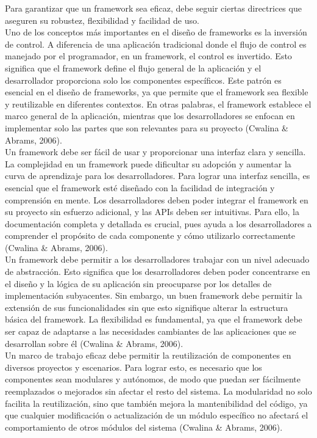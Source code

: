 \documentclass[12pt,letterpaper,spanish, xcolor=table]{report}
\numberwithin{figure}{subsection}
\begin{document}
Para garantizar que un framework sea eficaz, debe seguir ciertas directrices que aseguren su robustez, flexibilidad y facilidad de uso.\\

Uno de los conceptos más importantes en el diseño de frameworks es la inversión de control. A diferencia de una aplicación tradicional donde el flujo de control es manejado por el programador, en un framework, el control es invertido. Esto significa que el framework define el flujo general de la aplicación y el desarrollador proporciona solo los componentes específicos. Este patrón es esencial en el diseño de frameworks, ya que permite que el 
framework sea flexible y reutilizable en diferentes contextos. En otras palabras, el framework establece el marco general de la aplicación, mientras que los desarrolladores se enfocan en implementar solo las partes que son relevantes para su proyecto (Cwalina \& Abrams, 2006).\\

Un framework debe ser fácil de usar y proporcionar una interfaz clara y sencilla. La complejidad en un framework puede dificultar su adopción y aumentar la curva de aprendizaje para los desarrolladores. Para lograr una interfaz sencilla, es esencial que el framework esté diseñado con la facilidad de integración y comprensión en mente. Los desarrolladores deben poder integrar el framework en su proyecto sin esfuerzo adicional, y 
las APIs deben ser intuitivas. Para ello, la documentación completa y detallada es crucial, pues ayuda a los desarrolladores a comprender el propósito de cada componente y cómo utilizarlo correctamente (Cwalina \& Abrams, 2006). \\

Un framework debe permitir a los desarrolladores trabajar con un nivel adecuado de abstracción. Esto significa que los desarrolladores deben poder concentrarse en el diseño y la lógica de su aplicación sin preocuparse por los detalles de implementación subyacentes. Sin embargo, un buen framework debe permitir la extensión de sus funcionalidades sin que esto signifique alterar la estructura básica del framework. La flexibilidad es fundamental, ya que el framework debe ser capaz de adaptarse a las necesidades cambiantes de las aplicaciones que se desarrollan sobre él (Cwalina \& Abrams, 2006).\\

Un marco de trabajo eficaz debe permitir la reutilización de componentes en diversos proyectos y escenarios. Para lograr esto, es necesario que los componentes sean modulares y autónomos, de modo que puedan ser fácilmente reemplazados o mejorados sin afectar el resto del sistema. La modularidad no solo facilita la reutilización, sino que también mejora la mantenibilidad del código, ya que cualquier modificación o actualización de un módulo específico no afectará el comportamiento de otros módulos del sistema (Cwalina \& Abrams, 2006).\\
\end{document}
